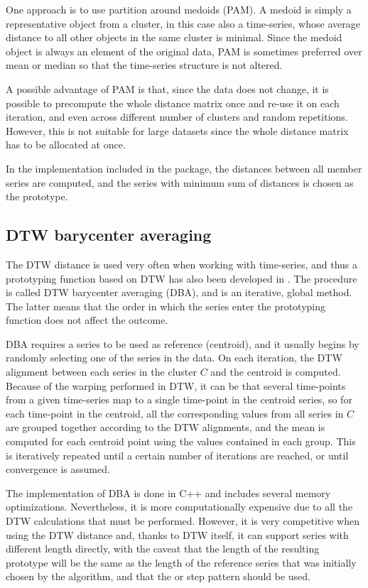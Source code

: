 One approach is to use partition around medoids (PAM).
A medoid is simply a representative object from a cluster,
in this case also a time-series,
whose average distance to all other objects in the same cluster is minimal.
Since the medoid object is always an element of the original data,
PAM is sometimes preferred over mean or median so that the time-series structure is not altered.

A possible advantage of PAM is that,
since the data does not change,
it is possible to precompute the whole distance matrix once and re-use it on each iteration,
and even across different number of clusters and random repetitions.
However, this is not suitable for large datasets since the whole distance matrix has to be allocated at once.

In the implementation included in the package,
the distances between all member series are computed,
and the series with minimum sum of distances is chosen as the prototype.

\subsection{DTW barycenter averaging}
\label{sec:dba}

The DTW distance is used very often when working with time-series,
and thus a prototyping function based on DTW has also been developed in \citet{petitjean2011}.
The procedure is called DTW barycenter averaging (DBA),
and is an iterative, global method.
The latter means that the order in which the series enter the prototyping function does not affect the outcome.

DBA requires a series to be used as reference (centroid),
and it usually begins by randomly selecting one of the series in the data.
On each iteration, the DTW alignment between each series in the cluster $C$ and the centroid is computed.
Because of the warping performed in DTW,
it can be that several time-points from a given time-series map to a single time-point in the centroid series,
so for each time-point in the centroid,
all the corresponding values from all series in $C$ are grouped together according to the DTW alignments,
and the mean is computed for each centroid point using the values contained in each group.
This is iteratively repeated until a certain number of iterations are reached,
or until convergence is assumed.

The \dtwclust{} implementation of DBA is done in C++ and includes several memory optimizations.
Nevertheless, it is more computationally expensive due to all the DTW calculations that must be performed.
However, it is very competitive when using the DTW distance and,
thanks to DTW itself,
it can support series with different length directly,
with the caveat that the length of the resulting prototype will be the same as the length of the reference series that was initially chosen by the algorithm,
and that the  or  step pattern should be used.

